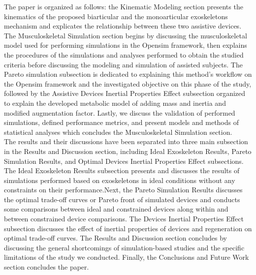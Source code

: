 \documentclass[10pt,letterpaper]{article}
\begin{document}
The paper is organized as follows: the Kinematic Modeling section presents the kinematics of the proposed biarticular and the monoarticular exoskeletons mechanism and explicates the relationship between these two assistive devices. The Musculoskeletal Simulation section begins by discussing the musculoskeletal model used for performing simulations in the Opensim framework, then explains the procedures of the simulations and analyses performed to obtain the studied criteria before discussing the modeling and simulation of assisted subjects. The Pareto simulation subsection is dedicated to explaining this method's workflow on the Opensim framework and the investigated objective on this phase of the study, followed by the Assistive Devices Inertial Properties Effect subsection organized to explain the developed metabolic model of adding mass and inertia and modified augmentation factor. Lastly, we discuss the validation of performed simulations, defined performance metrics, and present models and methods of statistical analyses which concludes the Musculoskeletal Simulation section.\\
The results and their discussions have been separated into three main subsection in the Results and Discussion section, including Ideal Exoskeleton Results, Pareto Simulation Results, and Optimal Devices Inertial Properties Effect subsections. The Ideal Exoskeleton Results subsection presents and discusses the results of simulations performed based on exoskeletons in ideal conditions without any constraints on their performance.Next, the Pareto Simulation Results discusses the optimal trade-off curves or Pareto front of simulated devices and conducts some comparisons between ideal and constrained devices along within and between constrained device comparisons. The Devices Inertial Properties Effect subsection discusses the effect of  inertial properties of devices and regeneration on optimal trade-off curves. The Results and Discussion section concludes by discussing the general shortcomings of simulation-based studies and the specific limitations of the study we conducted. Finally, the Conclusions and Future Work section concludes the paper.

\end{document}

